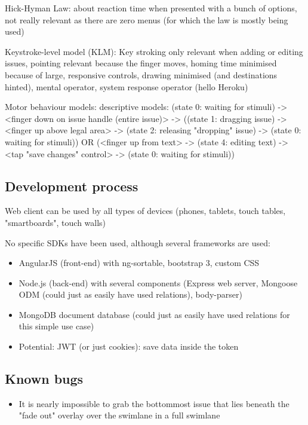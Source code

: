 Hick-Hyman Law: about reaction time when presented with a bunch of options, not really relevant as there are zero menus (for which the law is mostly being used)

Keystroke-level model (KLM): Key stroking only relevant when adding or editing issues, pointing relevant because the finger moves, homing time minimised because of large, responsive controls, drawing minimised (and destinations hinted), mental operator, system response operator (hello Heroku) %

Motor behaviour models: descriptive models: (state 0: waiting for stimuli) -> <finger down on issue handle (entire issue)> -> ((state 1: dragging issue) -> <finger up above legal area> -> (state 2: releasing "dropping" issue) -> (state 0: waiting for stimuli)) OR (<finger up from text> -> (state 4: editing text) -> <tap "save changes" control> -> (state 0: waiting for stimuli))

\subsection{Development process}

Web client can be used by all types of devices (phones, tablets, touch tables, "smartboards", touch walls)

No specific SDKs have been used, although several frameworks are used:
\begin{itemize}
  \item AngularJS (front-end) with ng-sortable, bootstrap 3, custom CSS
  \item Node.js (back-end) with several components (Express web server, Mongoose ODM (could just as easily have used relations), body-parser)
  \item MongoDB document database (could just as easily have used relations for this simple use case)
  \item Potential: JWT (or just cookies): save data inside the token
\end{itemize}

\subsection{Known bugs}

\begin{itemize}
  \item It is nearly impossible to grab the bottommost issue that lies beneath the "fade out" overlay over the swimlane in a full swimlane
\end{itemize}
